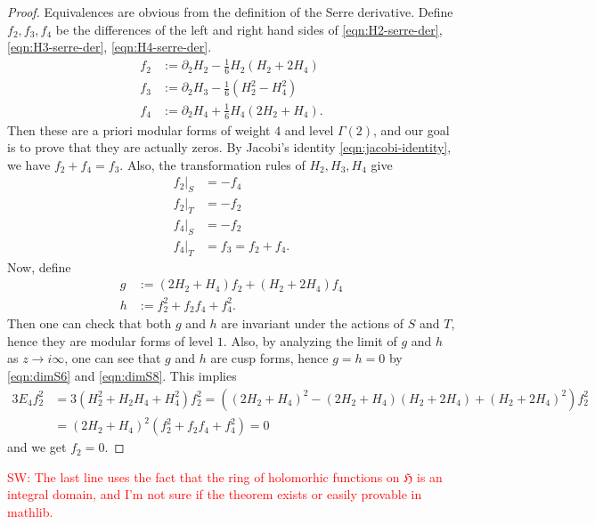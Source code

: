 \begin{proof}
Equivalences are obvious from the definition of the Serre derivative.
Define $f_{2}, f_{3}, f_{4}$ be the differences of the left and right hand sides of \eqref{eqn:H2-serre-der}, \eqref{eqn:H3-serre-der}, \eqref{eqn:H4-serre-der}.
\begin{align}
    f_{2} &:= \partial_{2} H_{2} - \frac{1}{6} H_{2}(H_{2} + 2H_{4}) \\
    f_{3} &:= \partial_{2} H_{3} - \frac{1}{6} (H_{2}^2 - H_{4}^2) \\
    f_{4} &:= \partial_{2} H_{4} + \frac{1}{6} H_{4}(2H_{2} + H_{4}).
\end{align}
Then these are a priori modular forms of weight $4$ and level $\Gamma(2)$, and our goal is to prove that they are actually zeros.
By Jacobi's identity \eqref{eqn:jacobi-identity}, we have $f_{2} + f_{4} = f_{3}$.
Also, the transformation rules of $H_2, H_3, H_4$ give
\begin{align}
    f_{2}|_{S} &= -f_{4} \\
    f_{2}|_{T} &= -f_{2} \\
    f_{4}|_{S} &= -f_{2} \\
    f_{4}|_{T} &= f_{3} = f_{2} + f_{4}.
\end{align}
Now, define
\begin{align}
    g &:= (2 H_2 + H_4) f_2 + (H_2 + 2 H_4) f_4 \\
    h &:= f_{2}^{2} + f_{2}f_{4} + f_{4}^{2}.
\end{align}
Then one can check that both $g$ and $h$ are invariant under the actions of $S$ and $T$, hence they are modular forms of level $1$.
Also, by analyzing the limit of $g$ and $h$ as $z \to i \infty$, one can see that $g$ and $h$ are cusp forms, hence $g = h = 0$ by \eqref{eqn:dimS6} and \eqref{eqn:dimS8}.
This implies
\begin{align}
    3 E_4 f_2^{2} &= 3 (H_2^2 + H_2 H_4 + H_4^2) f_2^{2} = ((2 H_2 + H_4)^{2} - (2H_2 + H_4)(H_2 + 2H_4) + (H_2 + 2H_4)^{2}) f_2^{2}\\
    &= (2 H_2 + H_4)^{2} (f_2^2 + f_2 f_4 + f_4^2) = 0
\end{align}
and we get $f_2 = 0$.
\end{proof}
\textcolor{red}{SW: The last line uses the fact that the ring of holomorhic functions on $\mathfrak{H}$ is an integral domain, and I'm not sure if the theorem exists or easily provable in mathlib.}

